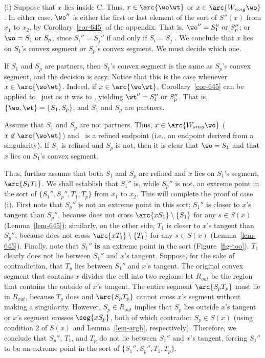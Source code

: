 (i) Suppose that $x$ lies inside C.
Thus, $x \in \arc{\wo\wt}$ or $x \in \arc{W_{sing}\wo}$.
In either case, 
$\wo''$ is either the first or last element of the sort of $S''(x)$
from $x_{1}$ to $x_{2}$, by Corollary~\ref{cor-645} of the appendix.
That is, $\wo'' = S_{1}'' \mbox{ or } S_{p}''$; or
$\wo = S_{1} \mbox{ or } S_{p}$, 
since $S_{i}'' = S_{j}''$ if and only if $S_{i}=S_{j}$ \cite[p. 75]{jj}.
We conclude that $x$ lies on $S_{1}$'s convex segment or 
$S_{p}$'s convex segment.
We must decide which one.

If $S_{1}$ and $S_{p}$ are partners, then $S_{1}$'s convex segment is the same as
$S_{p}$'s convex segment, and the decision is easy.
Notice that this is the case whenever $x \in \arc{\wo\wt}$.
Indeed, if $x \in \arc{\wo\wt}$,
Corollary~\ref{cor-645} can be applied to \wt\ just as it was to \wo, yielding
$\wt'' = S_{1}'' \mbox{ or } S_{p}''$.
That is, $\{\wo,\wt\} = \{S_{1},S_{p}\}$, and $S_{1}$ and $S_{p}$ are partners.

Assume that $S_{1}$ and $S_{p}$ are not partners.
Thus, $x \in \arc{W_{sing}\wo}$ ($x \not\in \arc{\wo\wt}$)
and  \wo\ is a refined endpoint (i.e., an endpoint derived from a singularity).
If $S_{1}$ is refined and $S_{p}$ is not, then it is clear that $\wo = S_{1}$ and that
$x$ lies on $S_{1}$'s convex segment.

Thus, further assume that both $S_{1}$ and $S_{p}$ are refined
and $x$ lies on $S_{1}$'s segment, $\arc{S_{1}T_{1}}$.
We shall establish that $S_{1}''$ is, while $S_{p}''$ is not, an extreme point
in the sort of $\{S_{1}'',S_{p}'',T_{1},T_{p}\}$ from $x_{1}$ to $x_{2}$.
This will complete the proof of case (i).
First note that $S_{p}''$ is not an extreme point in this sort:
$S_{1}''$ is closer to $x$'s tangent than $S_{p}''$,
because  does not cross $\arc{xS_{1}} \setminus \{S_{1}\}$ 
for any $s \in S(x)$ (Lemma~\ref{lem-645});
similarly, on the other side, $T_{1}$ is closer to $x$'s tangent than $S_{p}''$,
because  does not cross $\arc{xT_{1}} \setminus \{T_{1}\}$ 
for any $s \in S(x)$ (Lemma~\ref{lem-645}).
Finally, note that $S_{1}''$ {\bf is} an extreme point in the sort (Figure~\ref{fig-too}).
$T_{1}$ clearly does not lie between $S_{1}''$ and $x$'s tangent.
Suppose, for the sake of contradiction, that $T_{p}$ lies between $S_{1}''$ and $x$'s 
tangent.
The original convex segment that contains $x$ divides the cell into two regions:
let $R_{out}$ be the region that contains the outside of $x$'s tangent.
The entire segment $\arc{S_{p}T_{p}}$ must lie in $R_{out}$, because
$T_{p}$ does and $\arc{S_{p}T_{p}}$ cannot cross
$x$'s segment without making a singularity.
However, $S_{p} \in R_{out}$ implies that $S_{p}$ lies outside $x$'s tangent
or $x$'s segment crosses $\seg{xS_{p}}$, both of which contradict $S_{p} \in S(x)$
(using condition 2 of $S(x)$ and Lemma~\ref{lem-argh}, respectively).
Therefore,
we conclude that $S_{p}''$, $T_{1}$, and $T_{p}$ do not 
lie between $S_{1}''$ and $x$'s tangent,
forcing $S_{1}''$ to be an extreme point in the sort of $\{S_{1}'',S_{p}'',T_{1},T_{p}\}$.

